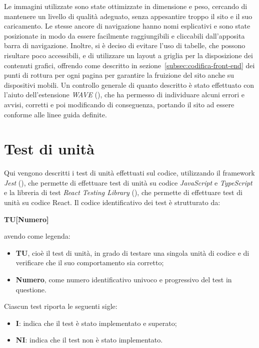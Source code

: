 Le immagini utilizzate sono state ottimizzate in dimensione e peso, cercando di mantenere un livello di qualità adeguato, senza appesantire troppo il sito e il suo caricamento.
Le stesse ancore di navigazione hanno nomi esplicativi e sono state posizionate in modo da essere facilmente raggiungibili e cliccabili dall'apposita barra di navigazione.
Inoltre, si è deciso di evitare l'uso di tabelle, che possono risultare poco accessibili, e di utilizzare un layout a griglia per la disposizione dei contenuti grafici, offrendo come descritto in sezione~\ref{subsec:codifica-front-end} dei punti di rottura per ogni pagina per garantire la fruizione del sito anche su dispositivi mobili.
Un controllo generale di quanto descritto è stato effettuato con l'aiuto dell'estensione \textit{WAVE} (\cite{site:wave}), che ha permesso di individuare alcuni errori e avvisi, corretti e poi modificando di conseguenza,
portando il sito ad essere conforme alle linee guida definite. 

\section{Test di unità}\label{sec:verifica-validazione-test}

Qui vengono descritti i test di unità effettuati sul codice, utilizzando il framework \textit{Jest} (\cite{site:jest}), che permette di effettuare test di unità su codice \textit{JavaScript} e \textit{TypeScript}
e la libreria di test \textit{React Testing Library} (\cite{site:reacttestinglibrary}), che permette di effettuare test di unità su codice React.
Il codice identificativo dei test è strutturato da:
\begin{center}
    \textbf{TU[Numero]}
  \end{center}
\textbf{}
avendo come legenda:
\begin{itemize}
\item \textbf{TU}, cioè il test di unità, in grado di testare una singola unità di codice e di verificare che il suo comportamento sia corretto;
\item \textbf{Numero}, come numero identificativo univoco e progressivo del test in questione.
\end{itemize}

Ciascun test riporta le seguenti sigle:
\begin{itemize}
\item \textbf{I}: indica che il test è stato implementato e superato;
\item \textbf{NI}: indica che il test non è stato implementato.
\end{itemize}

